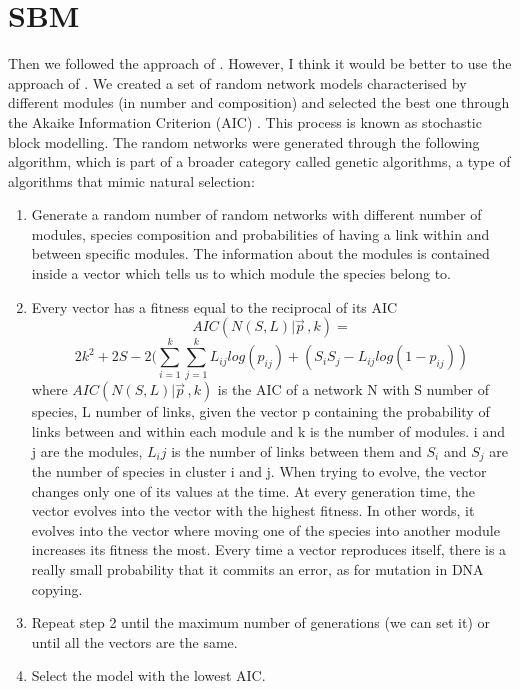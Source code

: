 \section{SBM}
        Then we followed the approach of \citet{Allesina2009a}. However, I think it would be better to use the approach of \citep{Sander2015}. We created a set of random network models characterised by different modules (in number and composition) and selected the best one through the Akaike Information Criterion (AIC) \citep{Akaike1998}. This process is known as stochastic block modelling. The random networks were generated through the following algorithm, which is part of a broader category called genetic algorithms, a type of algorithms that mimic natural selection:
        \begin{enumerate}
            \item Generate a random number of random networks with different number of modules, species composition and probabilities of having a link within and between specific modules. The information about the modules is contained inside a vector which tells us to which module the species belong to.
            \item Every vector has a fitness equal to the reciprocal of its AIC
            \begin{equation}
                AIC(N(S,L)|\vec{p}^{\,},k)=
            \end{equation}
            \begin{equation*}
                2k^2+2S-2(\sum^k_{i=1}\sum^k_{j=1}L_{ij}log(p_{ij})+(S_iS_j-L_{ij}log(1-p_{ij}))
            \end{equation*}
            where $AIC(N(S,L)|\vec{p}^{\,},k)$ is the AIC of a network N with S number of species, L number of links, given the vector p containing the probability of links between and within each module and k is the number of modules. i and j are the modules, $L_ij$ is the number of links between them and $S_i$ and $S_j$ are the number of species in cluster i and j. When trying to evolve, the vector changes only one of its values at the time. At every generation time, the vector evolves into the vector with the highest fitness. In other words, it evolves into the vector where moving one of the species into another module increases its fitness the most. Every time a vector reproduces itself, there is a really small probability that it commits an error, as for mutation in DNA copying.
            \item Repeat step 2 until the maximum number of generations (we can set it) or until all the vectors are the same.
            \item Select the model with the lowest AIC.
        \end{enumerate}

